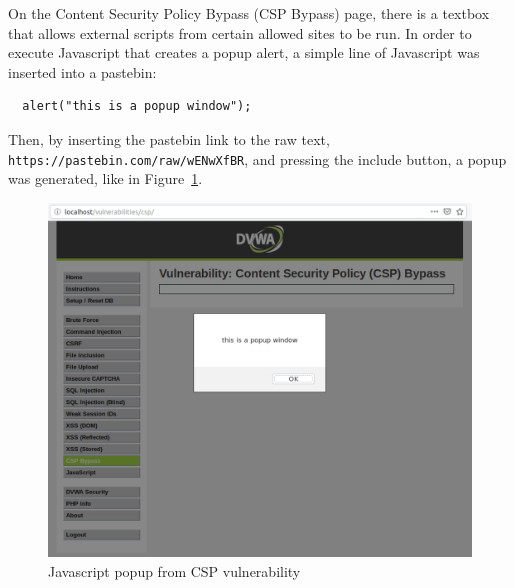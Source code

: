 \documentclass[11pt]{article}
\begin{document}
On the Content Security Policy Bypass (CSP Bypass) page, there is a textbox that allows external scripts from certain allowed sites
to be run. In order to execute Javascript that creates a popup alert, a simple line of Javascript was inserted into a pastebin:
\begin{verbatim}
  alert("this is a popup window");
\end{verbatim}
Then, by inserting the pastebin link to the raw text, \verb|https://pastebin.com/raw/wENwXfBR|, and pressing the include button, a popup
was generated, like in Figure~\ref{fig:CSP}.
\begin{figure}[!h]
  \centering
  \includegraphics[width=.71\linewidth]{./csp_popup.png}
  \caption{\label{fig:CSP}
  Javascript popup from CSP vulnerability}
\end{figure}
\end{document}
